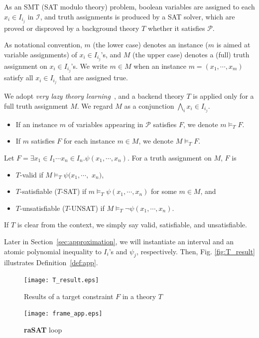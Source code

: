 \documentclass[runningheads,a4paper,oribibl]{llncs}
\begin{document}
As an SMT (SAT modulo theory) problem, 
boolean variables are assigned to each $x_i \in I_{i_j}$ in ${\mathcal I}$, 
and truth assignments is produced by a SAT solver, 
which are proved or disproved by a background theory $T$ whether it satisfies ${\mathcal P}$. 

As notational convention, $m$ (the lower case) denotes an instance 
($m$ is aimed at variable assignments) of $x_i \in I_{i_j}$'s, and 
$M$ (the upper case) denotes a (full) truth assignment on $x_i \in I_{i_j}$'s. 
We write $m \in M$ when an instance $m = (x_1,\cdots,x_m)$ satisfy all $x_i \in I_{i_j}$ that are assigned true. 


We adopt {\em very lazy theory learning}~\cite{dpll}, and 
a backend theory $T$ is applied only for a full truth assignment $M$. 
We regard $M$ as a conjunction $\bigwedge \limits_i x_i \in I_{i_j}$. 
\begin{itemize}
\item If an instance $m$ of variables appearing in ${\mathcal P}$ 
satisfies $F$, we denote $m \models_T F$. 
\item If $m$ satisfies $F$ for each instance $m \in M$, we denote $M \models_T F$. 
\end{itemize}

\begin{definition} \label{def:app}
Let $F = \exists x_1 \in I_1 \cdots x_n \in I_n. \psi(x_1,\cdots,x_n)$. 
For a truth assignment on $M$, $F$ is 
\begin{itemize}
\item $T$-valid if $M \models_T \psi(x_1,\cdots,$ $x_n)$, 
\item $T$-satisfiable ($T$-SAT) if $m \models_T \psi(x_1,\cdots,x_n)$ 
for some $m \in M$, and 
\item $T$-unsatisfiable ($T$-UNSAT) if $M \models_T \neg \psi(x_1,\cdots,x_n)$. 
\end{itemize}
If $T$ is clear from the context, we simply say valid, satisfiable, and unsatisfiable. 
\end{definition}

Later in Section~\ref{sec:approximation}, we will instantiate an interval and 
an atomic polynomial inequality to $I_i$'s and $\psi_j$, respectively.
Then, Fig. \ref{fig:T_result} illustrates Definition~\ref{def:app}. 
\begin{figure} [ht]
\centering
\begin{minipage}[b]{0.45\linewidth}
  \texttt{[image: T\_result.eps]}
\caption{Results of a target constraint $F$ in a theory $T$}
\label{fig:T_result}
\end{minipage}
\quad
\begin{minipage}[b]{0.45\linewidth}
   \texttt{[image: frame\_app.eps]}
\caption{{\bf raSAT} loop}
\label{fig:frame}
\end{minipage}

\end{figure}
\end{document}
